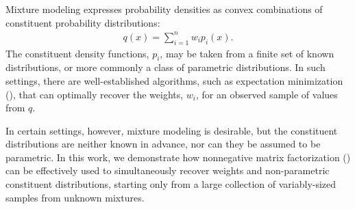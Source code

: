 \documentclass[conference]{IEEEtran}
\title{\vspace{-0.25em}\thetitle}
\author{
{\large{Stefan~Karpinski, John~R.~Gilbert, Elizabeth~M.~Belding}} \vspace{0.25em}\\
Department of Computer Science \\
University of California, Santa Barbara \vspace{0.35em}\\
\textit{\{sgk,gilbert,ebelding\}@cs.ucsb.edu}
}
\begin{document}
\maketitle

Mixture modeling expresses probability densities as convex combinations of constituent probability distributions:
\begin{align}
  q(x) = \sum_{i=1}^n w_i p_i(x).
\end{align}
The constituent density functions, $p_i$, may be taken from a finite set of known distributions, or more commonly a class of parametric distributions.
In such settings, there are well-established algorithms, such as expectation minimization (), that can optimally recover the weights, $w_i$, for an observed sample of values from $q$.

In certain settings, however, mixture modeling is desirable, but the constituent distributions are neither known in advance, nor can they be assumed to be parametric.
In this work, we demonstrate how nonnegative matrix factorization () can be effectively used to simultaneously recover weights and non-parametric constituent distributions, starting only from a large collection of variably-sized samples from unknown mixtures.
\end{document}
